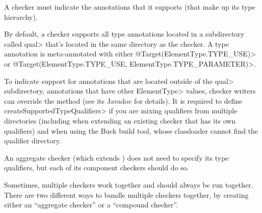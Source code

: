 
A checker must indicate the annotations that it supports (that make up its type
hierarchy).

By default, a checker supports all type annotations located in a
subdirectory called \<qual> that's located in the same directory as the checker.
A type annotation is meta-annotated with either
\<@Target(ElementType.TYPE\_USE)>
or
\<@Target({ElementType.TYPE\_USE, ElementType.TYPE\_PARAMETER})>.

To indicate support for annotations that are located outside of the \<qual>
subdirectory, annotations that have other \<ElementType> values,
checker writers can override the
method (see its Javadoc for details).
It is required to define \<createSupportedTypeQualifiers> if you are mixing
qualifiers from multiple directories (including when extending an existing
checker that has its own qualifiers) and when using the Buck build tool,
whose classloader cannot find the qualifier directory.

An aggregate checker (which extends
) does not need to specify its
type qualifiers, but each of its component checkers should do so.



Sometimes, multiple checkers work together and should always be run
together.  There are two different ways to bundle multiple checkers
together, by creating either an ``aggregate checker'' or a ``compound checker''.


